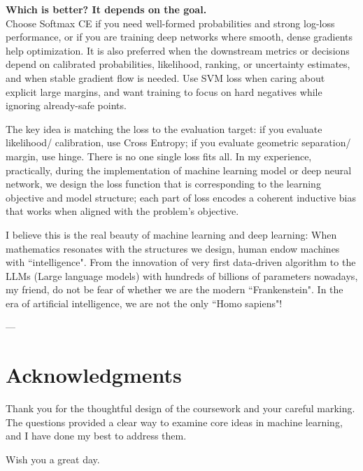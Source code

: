 \documentclass[12pt,a4paper]{article}
\begin{document}
	\medskip
	\textbf{Which is better? It depends on the goal.}\\
	Choose Softmax CE if you need well-formed probabilities and strong log-loss performance, or if you are training deep networks where smooth, dense gradients help optimization. It is also preferred when the downstream metrics or decisions depend on calibrated probabilities, likelihood, ranking, or uncertainty estimates, and when stable gradient flow is needed.
	Use SVM loss when caring about explicit large margins, and want training to focus on hard negatives while ignoring already-safe points.
	
	The key idea is matching the loss to the evaluation target: if you evaluate likelihood/ calibration, use Cross Entropy; if you evaluate geometric separation/ margin, use hinge. 
	There is no one single loss fits all. In my experience, practically, during the implementation of machine learning model or deep neural network, we design the loss function that is corresponding to the learning objective and model structure; each part of loss encodes a coherent inductive bias that works when aligned with the problem’s objective.
	
	I believe this is the real beauty of machine learning and deep learning: When mathematics resonates with the structures we design, human endow machines with ``intelligence". From the innovation of very first data-driven algorithm to the LLMs (Large language models) with hundreds of billions of parameters nowadays, my friend, do not be fear of whether we are the modern ``Frankenstein". In the era of artificial intelligence, we are not the only ``Homo sapiens"!
	
	---
	
	\section*{Acknowledgments}
	Thank you for the thoughtful design of the coursework and your careful marking. The questions provided a clear way to examine core ideas in machine learning, and I have done my best to address them.
	
	Wish you a great day.
	
\end{document}
